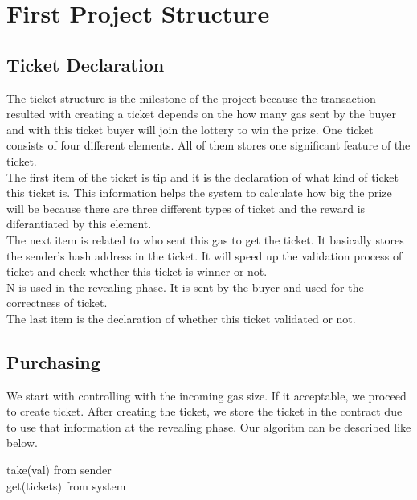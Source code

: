 \documentclass[]{scrreprt}
\begin{document}
	 \section{First Project Structure}
		\subsection{Ticket Declaration}
		The ticket structure is the milestone of the project because the transaction resulted with creating a ticket depends on the how many gas sent by the buyer and with this ticket buyer will join the lottery to win the prize. One ticket consists of four different elements. All of them stores one significant feature of the ticket.  \\
		The first item of the ticket is tip and it is the declaration of what kind of ticket this ticket is. This information helps the system to calculate how big the prize will be because there are three different types of ticket and the reward is diferantiated by this element. \\
		The next item is related to who sent this gas to get the ticket. It basically stores the sender's hash address in the ticket. It will speed up the validation process of ticket and check whether this ticket is winner or not.\\
		N is used in the revealing phase. It is sent by the buyer and used for the correctness of ticket. \\
		The last item is the declaration of whether this ticket validated or not.
		\subsection{Purchasing}
			We start with controlling with the incoming gas size. If it acceptable, we proceed to create ticket. After creating the ticket, we store the ticket in the contract due to use that information at the revealing phase. Our algoritm can be described like below.
			\begin{algorithm}[H]
				take(val) from sender\\
				get(tickets) from system\\
			\end{algorithm}
\end{document}
